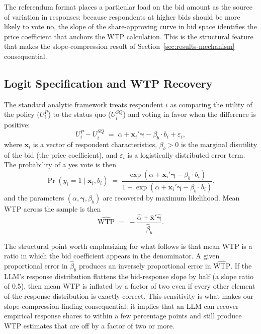 \documentclass[12pt]{article}
\begin{document}
The referendum format places a particular load on the bid amount as the source of variation in responses: because respondents at higher bids should be more likely to vote no, the slope of the share-approving curve in bid space identifies the price coefficient that anchors the WTP calculation. This is the structural feature that makes the slope-compression result of Section~\ref{sec:results-mechanism} consequential.

\subsection{Logit Specification and WTP Recovery}\label{sec:bg-logit}

The standard analytic framework treats respondent $i$ as comparing the utility of the policy ($U_i^P$) to the status quo ($U_i^{SQ}$) and voting in favor when the difference is positive:
\begin{equation}
    U_i^P - U_i^{SQ} \;=\; \alpha + \mathbf{x}_i'\boldsymbol{\gamma} - \beta_b \cdot b_i + \varepsilon_i,
    \label{eq:bg-utility}
\end{equation}
where $\mathbf{x}_i$ is a vector of respondent characteristics, $\beta_b > 0$ is the marginal disutility of the bid (the price coefficient), and $\varepsilon_i$ is a logistically distributed error term. The probability of a yes vote is then
\begin{equation}
    \Pr(y_i = 1 \mid \mathbf{x}_i, b_i) \;=\; \frac{\exp(\alpha + \mathbf{x}_i'\boldsymbol{\gamma} - \beta_b \cdot b_i)}{1 + \exp(\alpha + \mathbf{x}_i'\boldsymbol{\gamma} - \beta_b \cdot b_i)},
    \label{eq:bg-logit}
\end{equation}
and the parameters $(\alpha, \boldsymbol{\gamma}, \beta_b)$ are recovered by maximum likelihood. Mean WTP across the sample is then
\begin{equation}
    \widehat{\text{WTP}} \;=\; -\frac{\hat{\alpha} + \overline{\mathbf{x}}'\hat{\boldsymbol{\gamma}}}{\hat{\beta}_b}.
    \label{eq:bg-wtp}
\end{equation}

The structural point worth emphasizing for what follows is that mean WTP is a ratio in which the bid coefficient appears in the denominator. A given proportional error in $\hat{\beta}_b$ produces an inversely proportional error in $\widehat{\text{WTP}}$. If the LLM's response distribution flattens the bid-response slope by half (a slope ratio of 0.5), then mean WTP is inflated by a factor of two even if every other element of the response distribution is exactly correct. This sensitivity is what makes our slope-compression finding consequential: it implies that an LLM can recover empirical response shares to within a few percentage points and still produce WTP estimates that are off by a factor of two or more.
\end{document}
